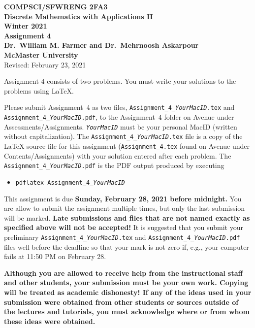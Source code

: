 \documentclass[11pt,fleqn]{article}
\begin{document}
\begin{center}

{\large \textbf{COMPSCI/SFWRENG 2FA3}}\\[2mm]
{\large \textbf{Discrete Mathematics with Applications II}}\\[2mm]
{\large \textbf{Winter 2021}}\\[8mm]
{\huge \textbf{Assignment 4}}\\[6mm]
{\large \textbf{Dr.~William M. Farmer and Dr.~Mehrnoosh Askarpour}}\\[2mm]
{\large \textbf{McMaster University}}\\[6mm]
{\large Revised: February 23, 2021}

\end{center}

\medskip

Assignment 4 consists of two problems.  You must write your solutions
to the problems using LaTeX.

Please submit Assignment~4 as two files,
\texttt{Assignment\_4\_\emph{YourMacID}.tex} and
\texttt{Assignment\_4\_\emph{YourMacID}.pdf}, to the Assignment~4
folder on Avenue under Assessments/Assignments.
\texttt{\emph{YourMacID}} must be your personal MacID (written without
capitalization).  The \texttt{Assignment\_4\_\emph{YourMacID}.tex}
file is a copy of the LaTeX source file for this assignment
(\texttt{Assignment\_4.tex} found on Avenue under
Contents/Assignments) with your solution entered after each problem.
The \texttt{Assignment\_4\_\emph{YourMacID}.pdf} is the PDF output
produced by executing

\begin{itemize}

  \item[] \texttt{pdflatex Assignment\_4\_\emph{YourMacID}}

\end{itemize}

This assignment is due \textbf{Sunday, February 28, 2021 before
  midnight.}  You are allow to submit the assignment multiple times,
but only the last submission will be marked.  \textbf{Late submissions
  and files that are not named exactly as specified above will not be
  accepted!}  It is suggested that you submit your preliminary
\texttt{Assignment\_4\_\emph{YourMacID}.tex} and
\texttt{Assignment\_4\_\emph{YourMacID}.pdf} files well before the
deadline so that your mark is not zero if, e.g., your computer fails
at 11:50 PM on February 28.

\textbf{Although you are allowed to receive help from the
  instructional staff and other students, your submission must be your
  own work.  Copying will be treated as academic dishonesty! If any of
  the ideas used in your submission were obtained from other students
  or sources outside of the lectures and tutorials, you must
  acknowledge where or from whom these ideas were obtained.}
\end{document}
